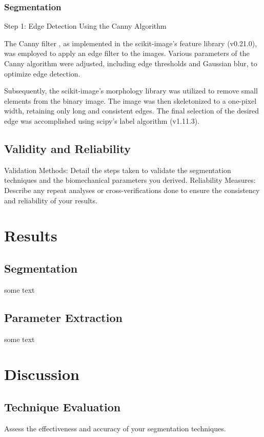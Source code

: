 \documentclass{micro-econ-thesis}
\begin{document}
\subsubsection{Segmentation}
Step 1: Edge Detection Using the Canny Algorithm

The Canny filter \parencite{canny_computational_1986}, as implemented in the scikit-image's feature library (v0.21.0), was employed to apply an edge filter to the images. Various parameters of the Canny algorithm were adjusted, including edge thresholds and Gaussian blur, to optimize edge detection.


 Subsequently, the scikit-image's morphology library was utilized to remove small elements from the binary image. The image was then skeletonized to a one-pixel width, retaining only long and consistent edges. The final selection of the desired edge was accomplished using scipy's label algorithm (v1.11.3).

\subsection{Validity and Reliability}
Validation Methods: Detail the steps taken to validate the segmentation techniques and the biomechanical parameters you derived.
Reliability Measures: Describe any repeat analyses or cross-verifications done to ensure the consistency and reliability of your results.

\section{Results}
\label{sec:yetanother}

\subsection{Segmentation}
\label{subsec:last}
some text 

\subsection{Parameter Extraction}
some text 

\section{Discussion}
\subsection{Technique Evaluation}
Assess the effectiveness and accuracy of your segmentation techniques. 
\end{document}
